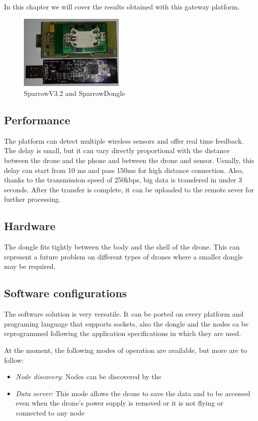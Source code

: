 \label{chap:results}

In this chapter we will cover the results obtained with this gateway platform.

\begin{figure}[ht] \centering
\includegraphics[width=0.45\textwidth]{img/sparrow.jpg} \caption{SparrowV3.2 and SparrowDongle} \end{figure}

 
\subsection{Performance}

The platform can detect multiple wireless sensors and offer real time feedback. 
The delay is small, but it can vary directly proportional with the distance 
between the drone and the phone and between the drone and sensor. Usually, this 
delay can start from 10 ms and pass 150ms for high distance connection. Also,
thanks to the transmission speed of 250kbps, big data is transfered in under 3 
seconds. After the transfer is complete, it can be uploaded to the remote sever 
for further processing.
 

\subsection{Hardware}

The dongle fits tightly between the body and the shell of the drone. This can 
represent a future problem on different types of drones where a smaller dongle 
may be required. 

\subsection{Software configurations}

The software solution is very versatile. It can be ported on every platform and 
programing language that supports sockets, also the dongle and the nodes ca be
reprogrammed following the application specifications in which they are used.
 
At the moment, the following modes of operation are available, but more are to follow:

\begin{itemize}

\item \textit{Node discovery}: Nodes can be discovered by the 

\item \textit{Data server}: This mode allows the drone to save the data and to
be accessed even when the drone's power supply is removed or it is not flying 
or connected to any node 

 \end{itemize}

 

